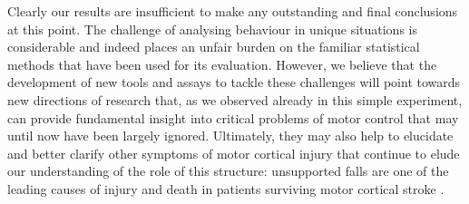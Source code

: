 Clearly our results are insufficient to make any outstanding and final conclusions at this point. The challenge of analysing behaviour in unique situations is considerable and indeed places an unfair burden on the familiar statistical methods that have been used for its evaluation. However, we believe that the development of new tools and assays to tackle these challenges will point towards new directions of research that, as we observed already in this simple experiment, can provide fundamental insight into critical problems of motor control that may until now have been largely ignored. Ultimately, they may also help to elucidate and better clarify other symptoms of motor cortical injury that continue to elude our understanding of the role of this structure: unsupported falls are one of the leading causes of injury and death in patients surviving motor cortical stroke \cite{Jacobs2014}.
